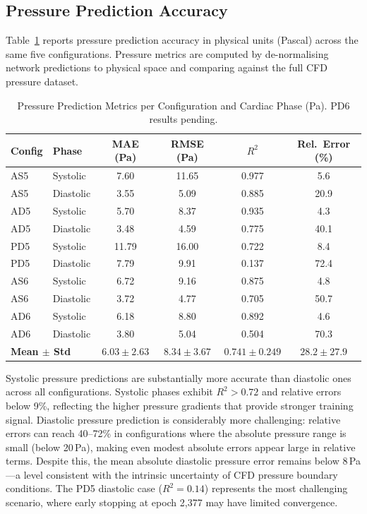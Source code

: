 \documentclass[11pt,a4paper]{article}
\begin{document}
\subsection{Pressure Prediction Accuracy}

Table~\ref{tab:pressure} reports pressure prediction accuracy in physical units (Pascal) across the same five configurations. Pressure metrics are computed by de-normalising network predictions to physical space and comparing against the full CFD pressure dataset.

\begin{table}[H]
\centering
\caption{Pressure Prediction Metrics per Configuration and Cardiac Phase (Pa). PD6 results pending.}
\label{tab:pressure}
\begin{tabular}{llcccc}
\toprule
\textbf{Config} & \textbf{Phase} & \textbf{MAE (Pa)} & \textbf{RMSE (Pa)} & \textbf{$R^2$} & \textbf{Rel.\ Error (\%)} \\
\midrule
AS5 & Systolic  & 7.60  & 11.65 & 0.977 &  5.6 \\
AS5 & Diastolic & 3.55  &  5.09 & 0.885 & 20.9 \\
AD5 & Systolic  & 5.70  &  8.37 & 0.935 &  4.3 \\
AD5 & Diastolic & 3.48  &  4.59 & 0.775 & 40.1 \\
PD5 & Systolic  & 11.79 & 16.00 & 0.722 &  8.4 \\
PD5 & Diastolic & 7.79  &  9.91 & 0.137 & 72.4 \\
AS6 & Systolic  & 6.72  &  9.16 & 0.875 &  4.8 \\
AS6 & Diastolic & 3.72  &  4.77 & 0.705 & 50.7 \\
AD6 & Systolic  & 6.18  &  8.80 & 0.892 &  4.6 \\
AD6 & Diastolic & 3.80  &  5.04 & 0.504 & 70.3 \\
\midrule
\multicolumn{2}{l}{\textbf{Mean $\pm$ Std}} & $\mathbf{6.03 \pm 2.63}$ & $\mathbf{8.34 \pm 3.67}$ & $\mathbf{0.741 \pm 0.249}$ & $\mathbf{28.2 \pm 27.9}$ \\
\bottomrule
\end{tabular}
\end{table}

Systolic pressure predictions are substantially more accurate than diastolic ones across all configurations. Systolic phases exhibit $R^2 > 0.72$ and relative errors below 9\%, reflecting the higher pressure gradients that provide stronger training signal. Diastolic pressure prediction is considerably more challenging: relative errors can reach 40--72\% in configurations where the absolute pressure range is small (below 20\,Pa), making even modest absolute errors appear large in relative terms. Despite this, the mean absolute diastolic pressure error remains below 8\,Pa---a level consistent with the intrinsic uncertainty of CFD pressure boundary conditions. The PD5 diastolic case ($R^2 = 0.14$) represents the most challenging scenario, where early stopping at epoch 2{,}377 may have limited convergence.
\end{document}
